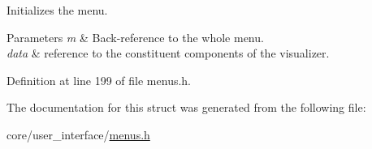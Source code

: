 Initializes the menu. 


\begin{DoxyParams}{Parameters}
{\em m} & Back-\/reference to the whole menu. \\
\hline
{\em data} & reference to the constituent components of the visualizer. \\
\hline
\end{DoxyParams}


Definition at line 199 of file menus.\+h.



The documentation for this struct was generated from the following file\+:\begin{DoxyCompactItemize}
\item 
core/user\+\_\+interface/\hyperlink{menus_8h}{menus.\+h}\end{DoxyCompactItemize}
